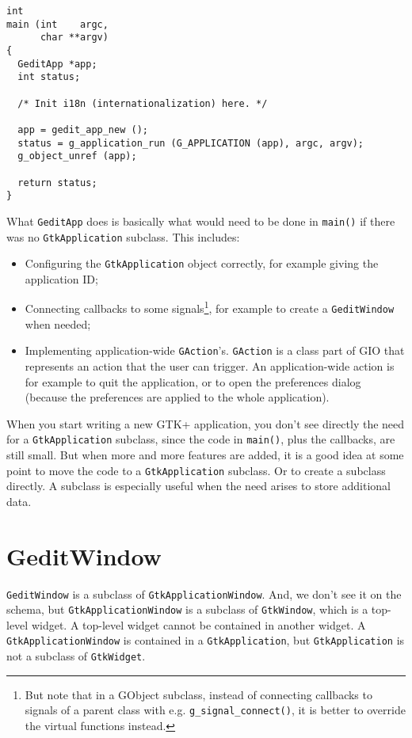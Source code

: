 \begin{lstlisting}
int
main (int    argc,
      char **argv)
{
  GeditApp *app;
  int status;

  /* Init i18n (internationalization) here. */

  app = gedit_app_new ();
  status = g_application_run (G_APPLICATION (app), argc, argv);
  g_object_unref (app);

  return status;
}
\end{lstlisting}

What \lstinline{GeditApp} does is basically what would need to be done in \lstinline{main()} if there was no \lstinline{GtkApplication} subclass. This includes:
\begin{itemize}
  \item Configuring the \lstinline{GtkApplication} object correctly, for example giving the application ID;
  \item Connecting callbacks to some signals\footnote{But note that in a GObject subclass, instead of connecting callbacks to signals of a parent class with e.g. \lstinline{g_signal_connect()}, it is better to override the virtual functions instead.}, for example to create a \lstinline{GeditWindow} when needed;
  \item Implementing application-wide \lstinline{GAction}'s. \lstinline{GAction} is a class part of GIO that represents an action that the user can trigger. An application-wide action is for example to quit the application, or to open the preferences dialog (because the preferences are applied to the whole application).
\end{itemize}

When you start writing a new GTK+ application, you don't see directly the need for a \lstinline{GtkApplication} subclass, since the code in \lstinline{main()}, plus the callbacks, are still small. But when more and more features are added, it is a good idea at some point to move the code to a \lstinline{GtkApplication} subclass. Or to create a subclass directly. A subclass is especially useful when the need arises to store additional data.

\section{GeditWindow}

\lstinline{GeditWindow} is a subclass of \lstinline{GtkApplicationWindow}. And, we don't see it on the schema, but \lstinline{GtkApplicationWindow} is a subclass of \lstinline{GtkWindow}, which is a top-level widget. A top-level widget cannot be contained in another widget. A \lstinline{GtkApplicationWindow} is contained in a \lstinline{GtkApplication}, but \lstinline{GtkApplication} is not a subclass of \lstinline{GtkWidget}.

